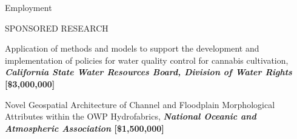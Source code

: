 \documentclass{resume_anzy} %
\begin{document}
\begin{rSection}{Employment}



\end{rSection}



\pagebreak 


\begin{rSection}{SPONSORED RESEARCH}
\begin{rSubsection}{}{}{}{}
\vspace{-2.5mm}
\item  Application of methods and models to support the development and implementation of policies for water quality control for cannabis cultivation,  \textbf{\textit{California State Water Resources Board, Division of Water Rights} [\$3,000,000]}


\item Novel Geospatial Architecture of Channel and Floodplain Morphological Attributes within the OWP Hydrofabrics, \textbf{\textit{National Oceanic and Atmospheric Association} [\$1,500,000]}

\end{rSubsection}
\end{rSection}
\end{document}
